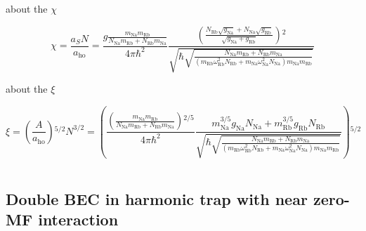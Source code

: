 about the $\chi $

\begin{equation}\chi =\frac{a_SN}{a_{\text{ho}}}=\frac{g \frac{m_{\text{Na}}m_{\text{Rb}}}{N_{\text{Na}}m_{\text{Rb}}+N_{\text{Rb}}m_{\text{Na}}}}{4\pi  \hbar
^2}\frac{\left(\frac{N_{\text{Rb}}\sqrt{g_{\text{Na}}}+N_{\text{Na}}\sqrt{g_{\text{Rb}}}}{\sqrt{g_{\text{Na}}+g_{\text{Rb}}}}\right){}^2}{\sqrt{\hbar
\sqrt{\frac{N_{\text{Na}}m_{\text{Rb}}+N_{\text{Rb}}m_{\text{Na}}}{\left(m_{\text{Rb}} \omega _{\text{Rb}}^2N_{\text{Rb}}+m_{\text{Na}} \omega _{\text{Na}}^2N_{\text{Na}}\right)m_{\text{Na}}m_{\text{Rb}}}}}}\end{equation}

about the $\xi $

\begin{equation}\xi =\left(\frac{A}{a_{\text{ho}}}\right){}^{5/2}N^{3/2}=\left(\frac{\left(\frac{ m_{\text{Na}}m_{\text{Rb}}}{N_{\text{Na}}m_{\text{Rb}}+N_{\text{Rb}}m_{\text{Na}}}\right){}^{2/5}}{4\pi
 \hbar ^2}\frac{m_{\text{Na}}^{3/5}g_{\text{Na}}N_{\text{Na}}+m_{\text{Rb}}^{3/5}g_{\text{Rb}}N_{\text{Rb}}}{\sqrt{\hbar \sqrt{\frac{N_{\text{Na}}m_{\text{Rb}}+N_{\text{Rb}}m_{\text{Na}}}{\left(m_{\text{Rb}}
\omega _{\text{Rb}}^2N_{\text{Rb}}+m_{\text{Na}} \omega _{\text{Na}}^2N_{\text{Na}}\right)m_{\text{Na}}m_{\text{Rb}}}}}}\right){}^{5/2}\end{equation}

\begin{equation}\text{}\end{equation}

\subsection*{Double BEC in harmonic trap with near zero-MF interaction }


